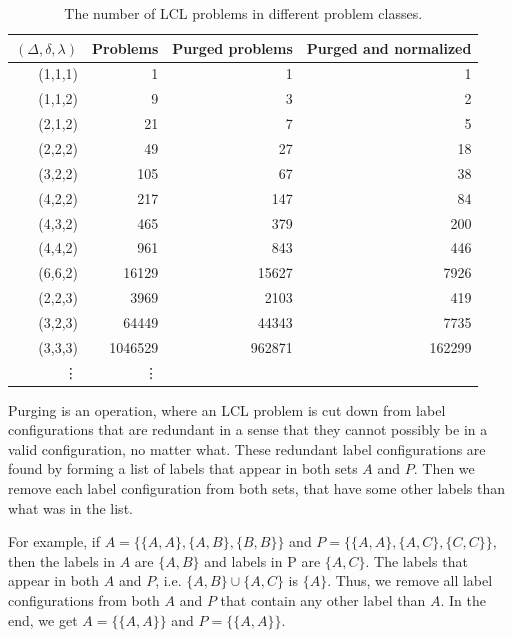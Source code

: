 \begin{table}[H]
  \centering
  \begin{tabular}{r|rrr}
    \toprule
    $(\Delta, \delta, \lambda)$ & Problems & Purged problems & Purged and normalized\\
    \midrule
    (1,1,1)& 1 & 1 & 1 \\
    (1,1,2)& 9 & 3 & 2 \\
    (2,1,2)& 21 & 7 & 5 \\
    (2,2,2)& 49 & 27 & 18 \\
    (3,2,2)& 105 & 67 & 38 \\
    (4,2,2)& 217 & 147 & 84 \\
    (4,3,2)& 465 & 379 & 200 \\
    (4,4,2)& 961 & 843 & 446 \\
    (6,6,2)& 16129 & 15627 & 7926 \\
    (2,2,3)& 3969 & 2103 & 419 \\
    (3,2,3)& 64449 & 44343 & 7735 \\
    (3,3,3)& 1046529 & 962871 & 162299 \\
    \vdots & \vdots\\
    \bottomrule
  \end{tabular}
  \caption{%
    The number of LCL problems in different problem classes.
  }
  \label{tbl:lcl_problem_classes}
\end{table}

Purging is an operation, where an LCL problem is cut down from label configurations that are redundant in a sense that they cannot possibly be in a valid configuration, no matter what.
These redundant label configurations are found by forming a list of labels that appear in both sets $A$ and $P$.
Then we remove each label configuration from both sets, that have some other labels than what was in the list.

For example, if $A=\{\{A, A\}, \{A, B\}, \{B, B\}\}$ and $P=\{\{A, A\}, \{A, C\}, \{C, C\}\}$, then the labels in $A$ are $\{A, B\}$ and labels in P are $\{A, C\}$.
The labels that appear in both $A$ and $P$, i.e.  $\{A, B\} \cup \{A, C\} $ is $\{A\}$.
Thus, we remove all label configurations from both $A$ and $P$ that contain any other label than $A$.
In the end, we get $A=\{\{A, A\}\}$ and $P=\{\{A, A\}\}$.


